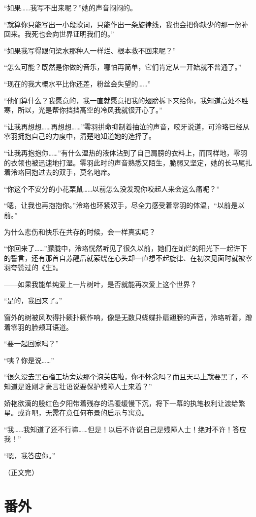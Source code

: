 \documentclass[UTF8, scheme = chinese, openany]{ctexbook}
\begin{document}
“如果……我写不出来呢？”她的声音闷闷的。

“就算你只能写出一小段歌词，只能作出一条旋律线，我也会把你缺少的那一份补回来。我死也会向世界证明我们的。”

“如果我写得跟何梁水那种人一样烂、根本救不回来呢？”

“怎么可能？既然是你做的音乐，哪怕再简单，它们肯定从一开始就不普通了。”

“现在的我大概水平比你还差，粉丝会失望的……”

“他们算什么？我愿意的，我一直就愿意把我的翅膀拆下来给你，我知道高处不胜寒，所以，光是帮你挡挡高空的冷风我就很开心了。”

“让我再想想……再想想……”零羽拼命抑制着抽泣的声音，咬牙说道，可泠珞已经从零羽拥抱自己的力度中，清楚地知道她的选择了。

“让我再抱抱你……”有什么温热的液体沾到了自己肩膀的衣料上，而同样地，零羽的衣领也被迅速地打湿。零羽此时的声音熟悉又陌生，脆弱又坚定，她的长马尾扎着泠珞回抱过去的双手，莫名地痒。

“你这个不安分的小花栗鼠……以前怎么没发现你咬起人来会这么痛呢？”

“嗯，让我也再抱抱你。”泠珞也环紧双手，尽全力感受着零羽的体温，“以前是以前。”

为什么悲伤和快乐在共存的时候，会一样真实呢？

“你回来了……”朦胧中，泠珞恍然听见了很久以前，她们在灿烂的阳光下一起许下的誓言，还有那首自苏醒后就萦绕在心头却一直想不起旋律、在初次见面时就被零羽夸赞过的《生》。

——如果我能单纯爱上一片树叶，是否就能再次爱上这个世界？

“是的，我回来了。”

窗外的树被风吹得扑簌扑簌作响，像是无数只蝴蝶扑扇翅膀的声音，泠珞听着，蹭着零羽的脸颊耳语道。

“要一起回家吗？”

“咦？你是说……”

“很久没去黑石榴工坊旁边那个泡芙店啦，你不怀念吗？而且天马上就要黑了，不知道是谁刚才豪言壮语说要保护残障人士来着？”

娇艳欲滴的殷红色夕阳带着残存的温暖缓慢下沉，将下一幕的执笔权利让渡给繁星。或许吧，无需在意任何布景的启示与寓意。

“我……我知道了还不行嘛……但是！以后不许说自己是残障人士！绝对不许！答应我！”

“嗯，我答应你。”

（正文完）

\chapter{番外}
\end{document}
